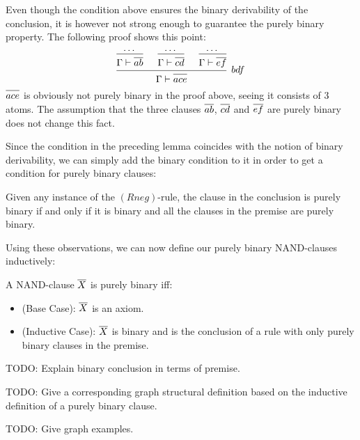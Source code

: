 Even though the condition above ensures the binary derivability of the conclusion, it is however not strong enough to guarantee the purely binary property.  The following proof shows this point:
\[
\begin{prooftree}
  \Hypo{\dots}
  \Infer1{\Gamma \vdash \ol{ab}}
  \Hypo{\dots}
  \Infer1{\Gamma \vdash \ol{cd}}
  \Hypo{\dots}
  \Infer1{\Gamma \vdash \ol{ef}}
  \Infer3[$bdf$]{\Gamma \vdash \ol{ace}}
\end{prooftree}
\]
$\ol{ace}$ is obviously not purely binary in the proof above, seeing it consists of 3 atoms.  The assumption that the three clauses $\ol{ab}$, $\ol{cd}$ and $\ol{ef}$ are purely binary does not change this fact.

Since the condition in the preceding lemma coincides with the notion of binary derivability, we can simply add the binary condition to it in order to get a condition for purely binary clauses:
\begin{corollary}
  Given any instance of the $(Rneg)$-rule, the clause in the conclusion is purely binary if and only if it is binary and all the clauses in the premise are purely binary.
\end{corollary}

Using these observations, we can now define our purely binary NAND-clauses inductively:
\begin{definition}
  A NAND-clause $\ol{X}$ is purely binary iff:
  \begin{itemize}
    \item (Base Case): $\ol{X}$ is an axiom.
    \item (Inductive Case): $\ol{X}$ is binary and is the conclusion of a rule with only purely binary clauses in the premise.
  \end{itemize}
\end{definition}

TODO: Explain binary conclusion in terms of premise.

TODO: Give a corresponding graph structural definition based on the inductive definition of a purely binary clause.

TODO: Give graph examples.
\pagebreak
